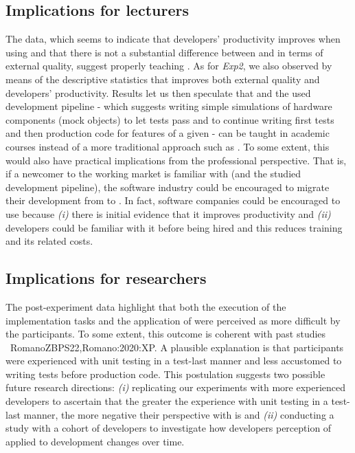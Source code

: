 \subsection{Implications for lecturers} 
The data, which seems to indicate that developers' productivity improves when using \tdd and that there is not a substantial difference between \tdd and \notdd in terms of external quality, suggest properly teaching \tdd. 
As for \textit{Exp2}, we also observed by means of the descriptive statistics that \tdd improves both external quality and developers' productivity. 
Results let us then speculate that \tdd and the used development pipeline \cite{TDDEC}- which suggests writing simple simulations of hardware components (mock objects) to let tests pass and to continue writing first tests and then production code for features of a given \es - can be taught in academic \es courses instead of a more traditional approach such as \notdd. 
To some extent, this would also have practical implications from the professional perspective. That is, if a newcomer to the working market is familiar with \tdd (and the studied development pipeline), the software industry could be encouraged to migrate their development from \notdd to \tdd. In fact, software companies could be encouraged to use \tdd because \textit{(i)} there is initial evidence that it improves productivity and \textit{(ii)} developers could be familiar with it before being hired and this reduces training and its related costs.


\subsection{Implications for researchers} 
The post-experiment data highlight that both the execution of the implementation tasks and the application of \tdd were perceived as more difficult by the participants. 
To some extent, this outcome is coherent with past studies \eg~{RomanoZBPS22,Romano:2020:XP}. 
A plausible explanation is that participants were experienced with unit testing in a test-last manner and less accustomed to writing tests before production code. 
This postulation suggests two possible future research directions: \textit{(i)} replicating our experiments  with more experienced developers to ascertain that the greater the experience with unit testing in a test-last manner, the more negative their perspective with \tdd is and \textit{(ii)} conducting a study with a cohort of developers to investigate how developers perception of \tdd applied to \es development changes over time.


